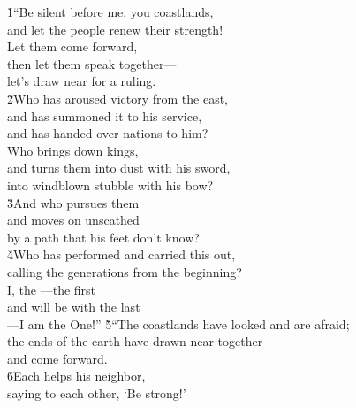 \begin{poetry}
\poeml {}
\v{1}``Be silent before me, you coastlands, \\
\poemll    and let the people renew their strength! \\
\poeml Let them come forward, \\
\poemll    then let them speak together--- \\
\poemlll       let's draw near for a ruling. \\
\poeml \v{2}Who has aroused victory from the east, \\
\poemll    and has summoned it to his service, \\
\poemlll       and has handed over nations to him? \\
\poeml Who brings down kings, \\
\poemll    and turns them into dust with his sword, \\
\poemlll       into windblown stubble with his bow? \\
\poeml \v{3}And who pursues them \\
\poemll    and moves on unscathed \\
\poemlll       by a path that his feet don't know? \\
\poeml \v{4}Who has performed and carried this out, \\
\poemll    calling the generations from the beginning? \\
\poeml I, the ---the first \\
\poemll    and will be with the last \\
\poemlll       ---I am the One!''
\poeml \v{5}``The coastlands have looked and are afraid; \\
\poemll    the ends of the earth have drawn near together \\
\poemlll       and come forward. \\
\poeml \v{6}Each helps his neighbor, \\
\poemll    saying to each other, `Be strong!' \\

\end{poetry}

